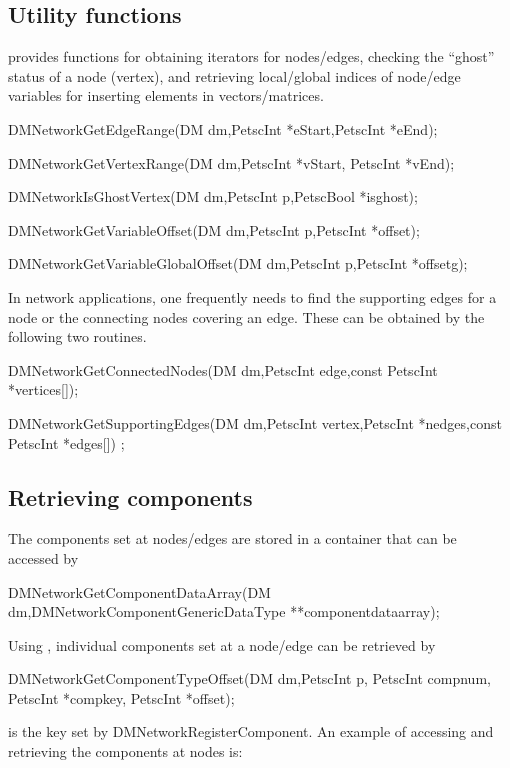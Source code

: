 {{\subsection{Utility functions}
   provides functions for obtaining iterators for nodes/edges, checking the ``ghost'' 
  status of a node (vertex), and retrieving local/global indices of node/edge variables for inserting 
  elements in vectors/matrices.
  \begin{tabbing}
    DMNetworkGetEdgeRange(DM dm,PetscInt *eStart,PetscInt *eEnd);
  \end{tabbing}
  \begin{tabbing}
    DMNetworkGetVertexRange(DM dm,PetscInt *vStart, PetscInt *vEnd);
  \end{tabbing}
  \begin{tabbing}
    DMNetworkIsGhostVertex(DM dm,PetscInt p,PetscBool *isghost);
  \end{tabbing}
  \begin{tabbing}
    DMNetworkGetVariableOffset(DM dm,PetscInt p,PetscInt *offset);
  \end{tabbing}
  \begin{tabbing}
    DMNetworkGetVariableGlobalOffset(DM dm,PetscInt p,PetscInt *offsetg);
  \end{tabbing}
  In network applications, one frequently needs to find the supporting edges for a node or
  the connecting nodes covering an edge. These can be obtained by the following two routines.
  \begin{tabbing}
    DMNetworkGetConnectedNodes(DM dm,PetscInt edge,const PetscInt *vertices[]);
  \end{tabbing}
  \begin{tabbing}
    DMNetworkGetSupportingEdges(DM dm,PetscInt vertex,PetscInt *nedges,const PetscInt *edges[]) ;
  \end{tabbing}  

\subsection{Retrieving components}
The components set at nodes/edges are stored in a container that can be accessed by
\begin{tabbing}
   DMNetworkGetComponentDataArray(DM dm,DMNetworkComponentGenericDataType **componentdataarray);
\end{tabbing}
  Using , individual components set at a node/edge can be retrieved by
\begin{tabbing}
 DMNetworkGetComponentTypeOffset(DM dm,PetscInt p, PetscInt compnum, PetscInt *compkey, PetscInt *offset);
\end{tabbing}
 is the key set by DMNetworkRegisterComponent. An example of accessing and retrieving the components at nodes is:

}}
